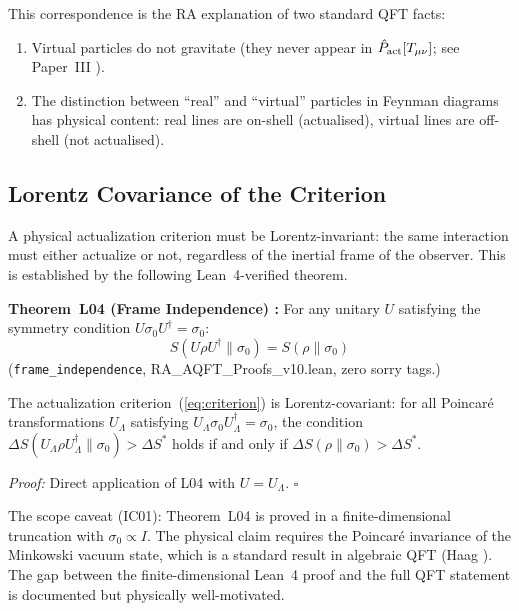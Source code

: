 \documentclass[12pt,a4paper]{article}
\begin{document}
This correspondence is the RA explanation of two standard QFT facts:
\begin{enumerate}
  \item Virtual particles do not gravitate (they never appear in $\hat{P}_{\mathrm{act}}[T_{\mu\nu}]$; see Paper~III \cite{RA_P3}).
  \item The distinction between ``real'' and ``virtual'' particles in Feynman diagrams has physical content: real lines are on-shell (actualised), virtual lines are off-shell (not actualised).
\end{enumerate}

\subsection{Lorentz Covariance of the Criterion}\label{sec:covariance}

A physical actualization criterion must be Lorentz-invariant: the same interaction must either actualize or not, regardless of the inertial frame of the observer.  This is established by the following Lean~4-verified theorem.

\begin{leanbox}
\textbf{Theorem~L04 (Frame Independence) \statusLV:} For any unitary $U$ satisfying the symmetry condition $U\sigma_0U^\dagger = \sigma_0$:
\begin{equation}
  S(U\rho U^\dagger\|\sigma_0) = S(\rho\|\sigma_0)
  \label{eq:frame_ind}
\end{equation}
(\texttt{frame\_independence}, RA\_AQFT\_Proofs\_v10.lean, zero sorry tags.)
\end{leanbox}

\begin{corollary}[D01, \statusDR]
The actualization criterion~(\ref{eq:criterion}) is Lorentz-covariant: for all Poincar\'e transformations $U_\Lambda$ satisfying $U_\Lambda\sigma_0 U_\Lambda^\dagger=\sigma_0$, the condition $\Delta S(U_\Lambda\rho U_\Lambda^\dagger\|\sigma_0)>\Delta S^*$ holds if and only if $\Delta S(\rho\|\sigma_0)>\Delta S^*$.
\end{corollary}

\textit{Proof:} Direct application of L04 with $U=U_\Lambda$. \qquad$\square$

The scope caveat (IC01): Theorem~L04 is proved in a finite-dimensional truncation with $\sigma_0\propto I$.  The physical claim requires the Poincar\'e invariance of the Minkowski vacuum state, which is a standard result in algebraic QFT (Haag \cite{Haag1996}).  The gap between the finite-dimensional Lean~4 proof and the full QFT statement is documented but physically well-motivated.
\end{document}
